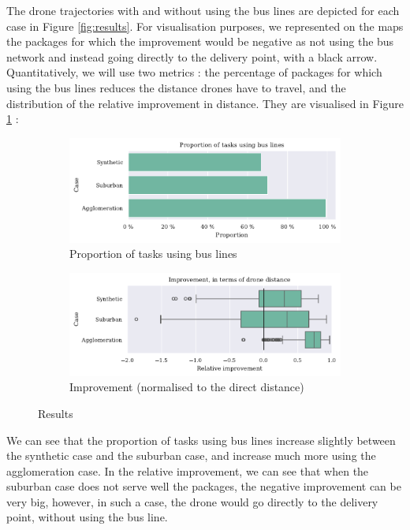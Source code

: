 The drone trajectories with and without using the bus lines are depicted for each case in Figure \ref{fig:results}. For visualisation purposes, we represented on the maps the packages for which the improvement would be negative as not using the bus network and instead going directly to the delivery point, with a black arrow. Quantitatively, we will use two metrics : the percentage of packages for which using the bus lines reduces the distance drones have to travel, and the distribution of the relative improvement in distance. They are visualised in Figure \ref{fig:results2} :

\begin{figure}
    \centering
    \begin{subfigure}[t]{0.49\linewidth}
        \centering
        \includegraphics[width=\linewidth]{"../fig/analysis_proportion.pdf"}
        \caption{Proportion of tasks using bus lines}        
    \end{subfigure}
    \begin{subfigure}[t]{0.49\linewidth}
        \centering
        \includegraphics[width=\linewidth]{"../fig/analysis_boxplot.pdf"}
        \caption{Improvement (normalised to the direct distance)}        
    \end{subfigure}
    \caption{Results}
    \label{fig:results2}
\end{figure}

We can see that the proportion of tasks using bus lines increase slightly between the synthetic case and the suburban case, and increase much more using the agglomeration case. In the relative improvement, we can see that when the suburban case does not serve well the packages, the negative improvement can be very big, however, in such a case, the drone would go directly to the delivery point, without using the bus line.

